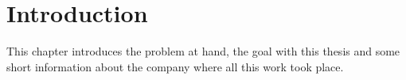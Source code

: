 \chapter{Introduction}

This chapter introduces the problem at hand, the goal with this thesis and some short information about the company where all this work took place.












